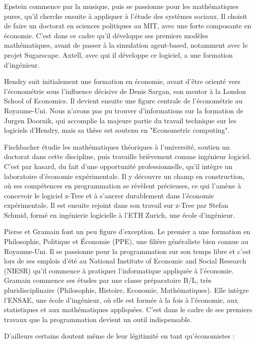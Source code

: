 Epstein commence par la musique, puis se passionne pour les mathématiques pures, qu’il cherche ensuite à appliquer à l’étude des systèmes sociaux. Il choisit de faire un doctorat en sciences politiques au MIT, avec une forte composante en économie. C’est dans ce cadre qu’il développe ses premiers modèles mathématiques, avant de passer à la simulation agent-based, notamment avec le projet Sugarscape. Axtell, avec qui il développe ce logiciel, a une formation d'ingénieur.

Hendry suit initialement une formation en économie, avant d’être orienté vers l’économétrie sous l’influence décisive de Denis Sargan, son mentor à la London School of Economics. Il devient ensuite une figure centrale de l’économétrie au Royaume-Uni. Nous n'avons pas pu trouver d'informations sur la formation de Jurgen Doornik, qui accomplie la majeure partie du travail technique sur les logiciels d'Hendry, mais sa thèse est soutenu en "Econometric computing".

Fischbacher étudie les mathématiques théoriques à l’université, soutien un doctorat dans cette discipline, puis travaille brièvement comme ingénieur logiciel. C’est par hasard, du fait d’une opportunité professionnelle, qu’il intègre un laboratoire d’économie expérimentale. Il y découvre un champ en construction, où ses compétences en programmation se révèlent précieuses, ce qui l’amène à concevoir le logiciel z-Tree et à s’ancrer durablement dans l’économie expérimentale. Il est ensuite rejoint dans son travail sur z-Tree par Stefan Schmid, formé en ingénierie logicielle à l’ETH Zurich, une école d'ingénieur.

Pierse et Gramain font un peu figure d'exception. Le premier a une formation en Philosophie, Politique et Économie (PPE), une filière généraliste bien connue au Royaume-Uni. Il se passionne pour la programmation sur son temps libre et c'est lors de ses emplois d’été au National Institute of Economic and Social Research (NIESR) qu'il commence à pratiquer l'informatique appliquée à l'économie. Gramain commence ses études par une classe préparatoire B/L, très pluridisciplinaire (Philosophie, Histoire, Economie, Mathématiques). Elle intègre l’ENSAE, une école d'ingénieur, où elle est formée à la fois à l’économie, aux statistiques et aux mathématiques appliquées. C’est dans le cadre de ses premiers travaux que la programmation devient un outil indispensable.

D'ailleurs certains doutent même de leur légitimité en tant qu'économistes :

